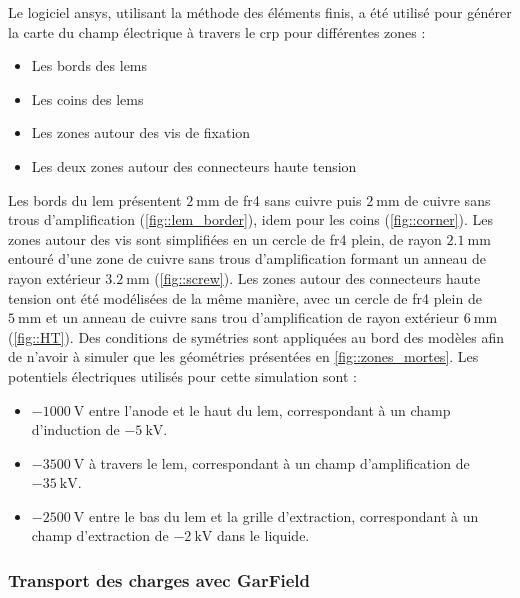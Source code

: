         Le logiciel \gls{ansys}, utilisant la méthode des éléments finis, a été utilisé pour générer la carte du champ électrique à travers le \gls{crp} pour différentes zones :
        \begin{itemize}
          \item Les bords des \glspl{lem}
          \item Les coins des \glspl{lem}
          \item Les zones autour des vis de fixation
          \item Les deux zones autour des connecteurs haute tension
        \end{itemize}
        Les bords du \gls{lem} présentent $\SI{2}{\milli\meter}$ de \gls{fr4} sans cuivre puis $\SI{2}{\milli\meter}$ de cuivre sans trous d'amplification (\autoref{fig::lem_border}), idem pour les coins (\autoref{fig::corner}). Les zones autour des vis sont simplifiées en un cercle de \gls{fr4} plein, de rayon $\SI{2.1}{\milli\meter}$ entouré d'une zone de cuivre sans trous d'amplification formant un anneau de rayon extérieur $\SI{3.2}{\milli\meter}$ (\autoref{fig::screw}). Les zones autour des connecteurs haute tension ont été modélisées de la même manière, avec un cercle de \gls{fr4} plein de $\SI{5}{\milli\meter}$ et un anneau de cuivre sans trou d'amplification de rayon extérieur $\SI{6}{\milli\meter}$ (\autoref{fig::HT}). Des conditions de symétries sont appliquées au bord des modèles afin de n'avoir à simuler que les géométries présentées en \autoref{fig::zones_mortes}. 
        Les potentiels électriques utilisés pour cette simulation sont : 
        \begin{itemize}
          \item $\SI{-1000}{\volt}$ entre l'anode et le haut du \gls{lem}, correspondant à un champ d'induction de $\SI{-5}{\kilo\volt}$.
          \item $\SI{-3500}{\volt}$ à travers le \gls{lem}, correspondant à un champ d'amplification de $\SI{-35}{\kilo\volt}$.
          \item $\SI{-2500}{\volt}$ entre le bas du \gls{lem} et la grille d'extraction, correspondant à un champ d'extraction de $\SI{-2}{\kilo\volt}$ dans le liquide.
        \end{itemize}
                
      \subsubsection{Transport des charges avec GarField}
            
